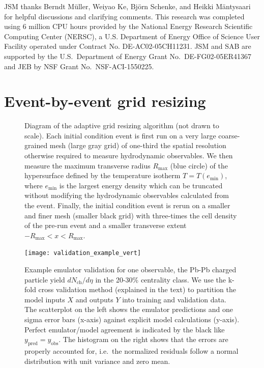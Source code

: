 \documentclass[aps,prc,reprint,amsmath,nofootinbib]{revtex4-1}
\newcommand{\nch}{N_\text{ch}}
\begin{document}
\medskip

\begin{acknowledgments}
  JSM thanks Berndt M\"uller, Weiyao Ke, Bj\"orn Schenke, and Heikki M\"antysaari for helpful discussions and clarifying comments.
  This research was completed using 6 million CPU hours provided by the National Energy Research Scientific Computing Center (NERSC), a U.S. Department of Energy Office of Science User Facility operated under Contract No. DE-AC02-05CH11231.
  JSM and SAB are supported by the U.S.\ Department of Energy Grant No.\ DE-FG02-05ER41367 and JEB by NSF Grant No.\ NSF-ACI-1550225.
\end{acknowledgments}



\appendix

\section{Event-by-event grid resizing}
\label{app:adaptive_grid}

\begin{figure}
  \caption{
    \label{fig:adaptive_grid}
    Diagram of the adaptive grid resizing algorithm (not drawn to scale).
    Each initial condition event is first run on a very large coarse-grained mesh (large gray grid) of one-third the spatial resolution otherwise required to measure hydrodynamic observables.
    We then measure the maximum transverse radius $R_\text{max}$ (blue circle) of the hypersurface defined by the temperature isotherm $T = T(e_\text{min})$, where $e_\text{min}$ is the largest energy density which can be truncated without modifying the hydrodynamic observables calculated from the event.
    Finally, the initial condition event is rerun on a smaller and finer mesh (smaller black grid) with three-times the cell density of the pre-run event and a smaller transverse extent $-R_\text{max} < x < R_\text{max}$.
  }
\end{figure}

\begin{figure}[b]
  \texttt{[image: validation\_example\_vert]}
  \caption{
    \label{fig:validation_example}
    Example emulator validation for one observable, the Pb-Pb charged particle yield $d\nch/d\eta$ in the 20-30\% centrality class.
    We use the k-fold cross validation method (explained in the text) to partition the model inputs $X$ and outputs $Y$ into training and validation data.
    The scatterplot on the left shows the emulator predictions and one sigma error bars (x-axis) against explicit model calculations (y-axis).
    Perfect emulator/model agreement is indicated by the black like $y_\text{pred}=y_\text{obs}$.
    The histogram on the right shows that the errors are properly accounted for, i.e.\ the normalized residuals follow a normal distribution with unit variance and zero mean.
  }
\end{figure}
\end{document}
